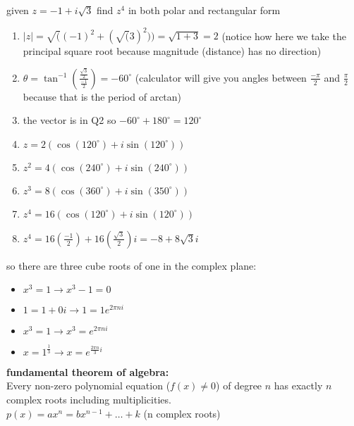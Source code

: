\documentclass{article}
\begin{document}
given $z = -1 + i\sqrt{3}$ find $z^4$ in both polar and rectangular form
	\begin{enumerate}
		\item $\lvert z\rvert = \sqrt((-1)^2 + (\sqrt(3)^2)) = \sqrt{1 + 3} = 2$ (notice how here we take the principal square root because magnitude (distance) has no direction)
		\item $\theta = \tan^{-1}(\frac{\frac{\sqrt{3}}{2}}{\frac{-1}{2}}) = -60^{\circ}$ (calculator will give you angles between $\frac{-\pi}{2}$ and $\frac{\pi}{2}$ because that is the period of arctan)
		\item the vector is in Q2 so $-60^{\circ} + 180^{\circ} = 120^{\circ}$
		\item $z = 2(\cos(120^{\circ}) + i\sin(120^{\circ}))$
		\item $z^2 = 4(\cos(240^{\circ}) + i\sin(240^{\circ}))$		
		\item $z^3 = 8(\cos(360^{\circ}) + i\sin(350^{\circ}))$
		\item $z^4 = 16(\cos(120^{\circ}) + i\sin(120^{\circ}))$
		\item $z^4 = 16(\frac{-1}{2}) + 16(\frac{\sqrt{3}}{2})i = -8 + 8\sqrt{3}i$
	\end{enumerate}

so there are three cube roots of one in the complex plane:\\
	\begin{itemize}
		\item $x^3 = 1 \to x^3 - 1 = 0$ 
		\item $1 = 1 + 0i \to 1 = 1e^{2\pi ni}$
		\item $x^3 = 1 \to x^3 = e^{2\pi ni}$
		\item $x = 1^{\frac{1}{3}} \to x = e^{\frac{2\pi n}{3}i}$
	\end{itemize}

\textbf{fundamental theorem of algebra:}\\

Every non-zero polynomial equation ($f(x) \neq 0$) of degree $n$ has exactly $n$ complex roots including multiplicities.\\

$p(x) = ax^n = bx^{n-1} + \ldots + k$ (n complex roots)\\
\end{document}
